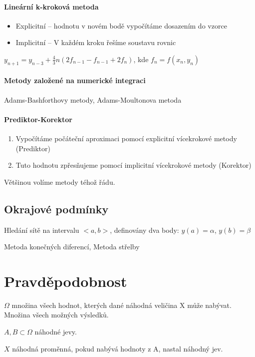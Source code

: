 \documentclass[a4paper, 11pt]{report}
\begin{document}
\paragraph{Lineární k-kroková metoda} 
\begin{itemize}
	\item Explicitní -- hodnotu v novém bodě vypočítáme dosazením do vzorce
	\item Implicitní -- V každém kroku řešíme soustavu rovnic
\end{itemize}

$y_{n+1} = y_{n-3} + \frac{4}{3} n \left( 2 f_{n-1} - f_{n-1} + 2f_{n} \right)$, kde $f_n = f(x_n, y_n)$

\paragraph{Metody založené na numerické integraci} Adams-Bashforthovy metody, Adams-Moultonova metoda

\paragraph{Prediktor-Korektor}
\begin{enumerate}
	\item Vypočítáme počáteční aproximaci pomocí explicitní vícekrokové metody (Prediktor)
	\item Tuto hodnotu zpřesňujeme pomocí implicitní vícekrokové metody (Korektor)
\end{enumerate}

Většinou volíme metody téhož řádu.

\subsection{Okrajové podmínky}
Hledání sítě na intervalu $<a, b>$, definovány dva body: $y(a) = \alpha$, $y(b) = \beta$

Metoda konečných diferencí, Metoda střelby

\section{Pravděpodobnost}

$\Omega$ množina všech hodnot, kterých dané náhodná veličina X může nabývat. Množina všech možných výsledků.

$A, B \subset \Omega$ náhodné jevy.

$X$ náhodná proměnná, pokud nabývá hodnoty z A, nastal náhodný jev.
\end{document}
